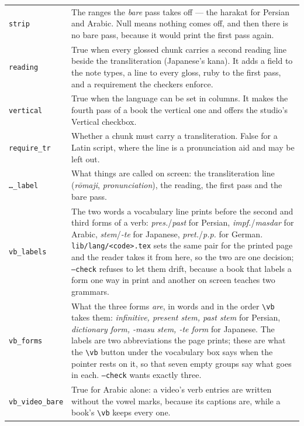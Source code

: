 \documentclass[11pt,oneside]{report}
\newcommand{\file}[1]{\texttt{#1}}
\newcommand{\menu}[1]{\textsf{#1}}
\begin{document}
\begin{center}
\begin{longtable}{@{}>{\raggedright\arraybackslash}p{}p{}@{}}
\texttt{strip} & The ranges the \emph{bare} pass takes off --- the harakat for
  Persian and Arabic. Null means nothing comes off, and then there is no bare
  pass, because it would print the first pass again. \\
\addlinespace
\texttt{reading} & True when every glossed chunk carries a second reading line
  beside the transliteration (Japanese's kana). It adds a field to the note
  types, a line to every gloss, ruby to the first pass, and a requirement the
  checkers enforce. \\
\addlinespace
\texttt{vertical} & True when the language can be set in columns. It makes the
  fourth pass of a book the vertical one and offers the studio's
  \menu{Vertical} checkbox. \\
\addlinespace
\texttt{require\_tr} & Whether a chunk must carry a transliteration. False for
  a Latin script, where the line is a pronunciation aid and may be left out. \\
\addlinespace
\texttt{\dots\_label} & What things are called on screen: the transliteration
  line (\emph{r\=omaji}, \emph{pronunciation}), the reading, the first pass and
  the bare pass. \\
\addlinespace
\texttt{vb\_labels} & The two words a vocabulary line prints before the second
  and third forms of a verb: \emph{pres.}/\emph{past} for Persian,
  \emph{impf.}/\emph{masdar} for Arabic, \emph{stem}/\emph{-te} for Japanese,
  \emph{pret.}/\emph{p.p.} for German. \file{lib/lang/<code>.tex} sets the
  same pair for the printed page and the reader takes it from here, so the
  two are one decision; \texttt{--check} refuses to let them drift, because a
  book that labels a form one way in print and another on screen teaches two
  grammars. \\
\addlinespace
\texttt{vb\_forms} & What the three forms \emph{are}, in words and in the
  order \texttt{\textbackslash vb} takes them: \emph{infinitive, present stem,
  past stem} for Persian, \emph{dictionary form, -masu stem, -te form} for
  Japanese. The labels are two abbreviations the page prints; these are what
  the \texttt{\textbackslash vb} button under the vocabulary box says when the
  pointer rests on it, so that seven empty groups say what goes in each.
  \texttt{--check} wants exactly three. \\
\addlinespace
\texttt{vb\_video\_bare} & True for Arabic alone: a video's verb entries are
  written without the vowel marks, because its captions are, while a book's
  \texttt{\textbackslash vb} keeps every one. \\

\end{longtable}
\end{center}
\end{document}
